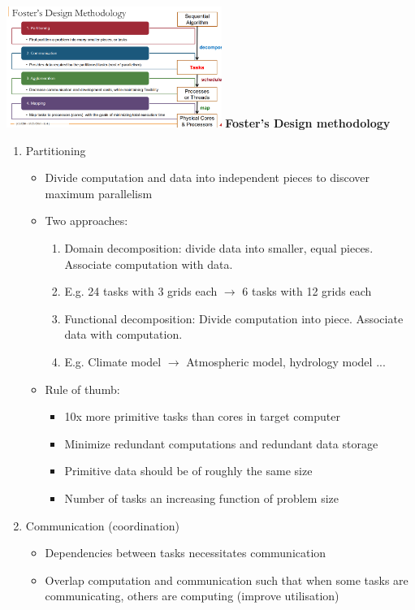 \documentclass[10pt, landscape]{article}
\begin{document}
\begin{multicols}{4}
\includegraphics*[width=7cm]{foster}
\textbf{Foster's Design methodology}
\begin{enumerate}
    \item Partitioning 
    \begin{itemize}
        \item Divide computation and data into independent pieces to discover maximum parallelism 
        \item Two approaches: 
        \begin{enumerate}
            \item Domain decomposition: divide data into smaller, equal pieces. Associate computation with data.
            \item E.g. 24 tasks with 3 grids each $\rightarrow$ 6 tasks with 12 grids each 
            \item Functional decomposition: Divide computation into piece. Associate data with computation.
            \item E.g. Climate model $\rightarrow$ Atmospheric model, hydrology model ...
        \end{enumerate}
        \item Rule of thumb:
        \begin{itemize}
            \item 10x more primitive tasks than cores in target computer 
            \item Minimize redundant computations and redundant data storage 
            \item Primitive data should be of roughly the same size 
            \item Number of tasks an increasing function of problem size
        \end{itemize}
    \end{itemize}
    \item Communication (coordination)
    \begin{itemize}
        \item Dependencies between tasks necessitates communication 
        \item Overlap computation and communication such that when some tasks are communicating, others are computing (improve utilisation)

\end{itemize}
\end{enumerate}
\end{multicols}
\end{document}

